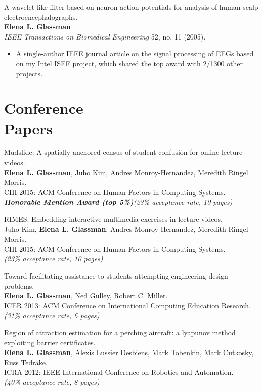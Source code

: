 \documentclass[margin]{res}
\begin{document}
\begin{resume}

A wavelet-like filter based on neuron action potentials for analysis of human scalp electroencephalographs.\\ 
{\bf Elena L. Glassman}\\
\textit{IEEE Transactions on Biomedical Engineering} 52, no. 11 (2005).
\begin{itemize} \itemsep -2pt  %
\item A single-author IEEE journal article on the signal processing of EEGs based on my Intel ISEF project, which shared the top award with 2/1300 other projects. 
\end{itemize}

\section{Conference\\ Papers}

Mudslide: A spatially anchored census of student confusion for online lecture videos.\\
{\bf Elena L. Glassman}, Juho Kim, Andres Monroy-Hernandez, Meredith Ringel Morris.\\
CHI 2015: ACM Conference on Human Factors in Computing Systems.\\
\textbf{\emph{Honorable Mention Award (top 5\%)}}{\it (23\% acceptance rate, 10 pages)}

RIMES: Embedding interactive multimedia exercises in lecture videos.\\
Juho Kim, {\bf Elena L. Glassman}, Andres Monroy-Hernandez, Meredith Ringel Morris. \\
CHI 2015: ACM Conference on Human Factors in Computing Systems.\\
{\it (23\% acceptance rate, 10 pages)}

Toward facilitating assistance to students attempting engineering design problems.\\
{\bf Elena L. Glassman}, Ned Gulley, Robert C. Miller. \\
ICER 2013: ACM Conference on International Computing Education Research.\\
{\it (31\% acceptance rate, 6 pages)}

Region of attraction estimation for a perching aircraft: a lyapunov method exploiting barrier certificates.\\
{\bf Elena L. Glassman}, Alexis Lussier Desbiens, Mark Tobenkin, Mark Cutkosky, Russ Tedrake.\\
ICRA 2012: IEEE International Conference on Robotics and Automation.\\
{\it (40\% acceptance rate, 8 pages)}


\end{resume}
\end{document}

